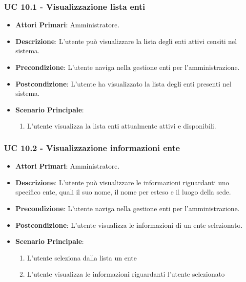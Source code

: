 			\subsubsection{UC 10.1 - Visualizzazione lista enti }
			\begin{itemize}
				\item \textbf{Attori Primari}: Amministratore.
				\item \textbf{Descrizione}: L'utente può visualizzare la lista degli enti attivi censiti nel sistema.
				\item \textbf{Precondizione}: L'utente naviga nella gestione enti per l'amministrazione.
				\item \textbf{Postcondizione}: L'utente ha visualizzato la lista degli enti presenti nel sistema.
				\item \textbf{Scenario Principale}:
				\begin{enumerate}
					\item{L'utente visualizza la lista enti attualmente attivi e disponibili.}
				\end{enumerate}	
			\end{itemize}

			\subsubsection{UC 10.2 - Visualizzazione informazioni ente}
			\begin{itemize}
				\item \textbf{Attori Primari}: Amministratore.
				\item \textbf{Descrizione}: L'utente può visualizzare le informazioni riguardanti uno specifico ente, quali il suo nome, il nome per esteso e il luogo della sede.
				\item \textbf{Precondizione}: L'utente naviga nella gestione enti per l'amministrazione.
				\item \textbf{Postcondizione}: L'utente visualizza le informazioni di un ente selezionato.
				\item \textbf{Scenario Principale}:
				\begin{enumerate}
					\item{L'utente seleziona dalla lista un ente}
					\item{L'utente visualizza le informazioni riguardanti l'utente selezionato}
				\end{enumerate}	
			\end{itemize}

